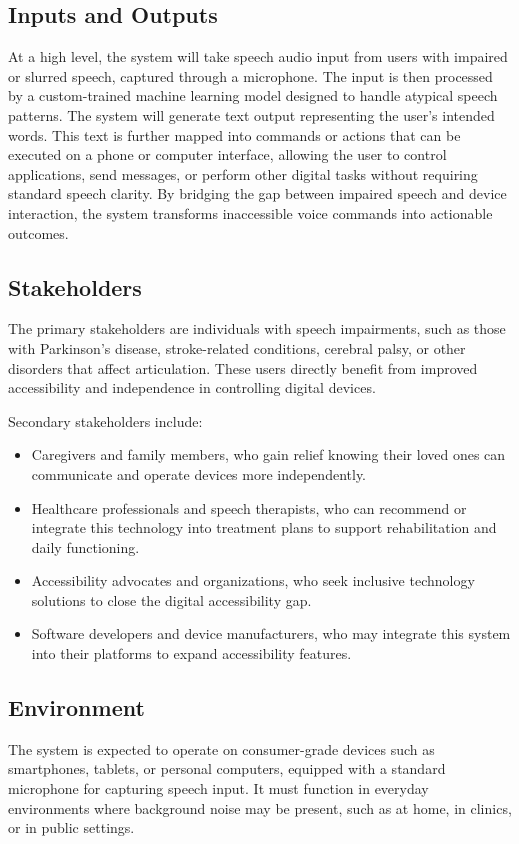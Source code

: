 \documentclass{article}
\begin{document}
\subsection{Inputs and Outputs}
At a high level, the system will take speech audio input from users with impaired or slurred speech, captured through a microphone. The input is then processed by a custom-trained machine learning model designed to handle atypical speech patterns. The system will generate text output representing the user's intended words. This text is further mapped into commands or actions that can be executed on a phone or computer interface, allowing the user to control applications, send messages, or perform other digital tasks without requiring standard speech clarity. By bridging the gap between impaired speech and device interaction, the system transforms inaccessible voice commands into actionable outcomes.

\subsection{Stakeholders}
The primary stakeholders are individuals with speech impairments, such as those with Parkinson's disease, stroke-related conditions, cerebral palsy, or other disorders that affect articulation. These users directly benefit from improved accessibility and independence in controlling digital devices.

Secondary stakeholders include:
\begin{itemize}
  \item Caregivers and family members, who gain relief knowing their loved ones can communicate and operate devices more independently.
  \item Healthcare professionals and speech therapists, who can recommend or integrate this technology into treatment plans to support rehabilitation and daily functioning.
  \item Accessibility advocates and organizations, who seek inclusive technology solutions to close the digital accessibility gap.
  \item Software developers and device manufacturers, who may integrate this system into their platforms to expand accessibility features.
\end{itemize}

\subsection{Environment}
The system is expected to operate on consumer-grade devices such as smartphones, tablets, or personal computers, equipped with a standard microphone for capturing speech input. It must function in everyday environments where background noise may be present, such as at home, in clinics, or in public settings.
\end{document}
